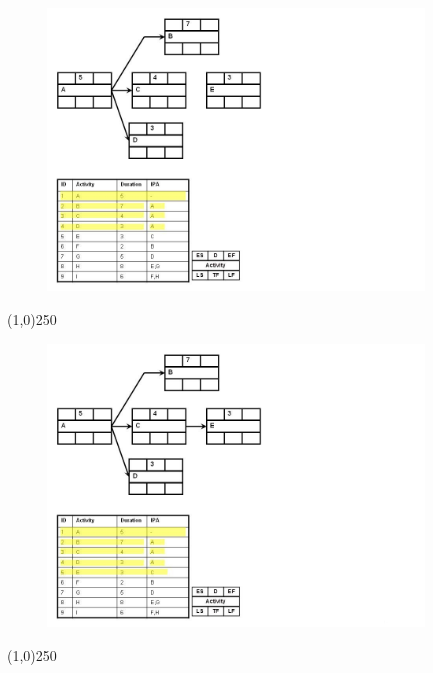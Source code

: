 \begin{frame}
\begin{figure}
	\centering
		\includegraphics[width = 10.0cm]{oldnotes/Slide132.jpg}
\end{figure}
\end{frame}
\begin{center}\line(1,0){250}\end{center}


\begin{frame}
\begin{figure}
	\centering
		\includegraphics[width = 10.0cm]{oldnotes/Slide133.jpg}
\end{figure}
\end{frame}
\begin{center}\line(1,0){250}\end{center}


